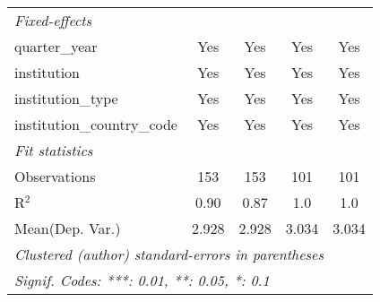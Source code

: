 \begin{tabular}{lcccc}
   \midrule
   \emph{Fixed-effects}\\
   quarter\_year                            & Yes           & Yes            & Yes            & Yes\\  
   institution                              & Yes           & Yes            & Yes            & Yes\\  
   institution\_type                        & Yes           & Yes            & Yes            & Yes\\  
   institution\_country\_code               & Yes           & Yes            & Yes            & Yes\\  
   \midrule
   \emph{Fit statistics}\\
   Observations                             & 153           & 153            & 101            & 101\\  
   R$^2$                                    & 0.90          & 0.87           & 1.0            & 1.0\\  
Mean(Dep. Var.) & 2.928 & 2.928 & 3.034 & 3.034 \\
   \midrule \midrule
   \multicolumn{5}{l}{\emph{Clustered (author) standard-errors in parentheses}}\\
   \multicolumn{5}{l}{\emph{Signif. Codes: ***: 0.01, **: 0.05, *: 0.1}}\\
\end{tabular}
\par\endgroup
